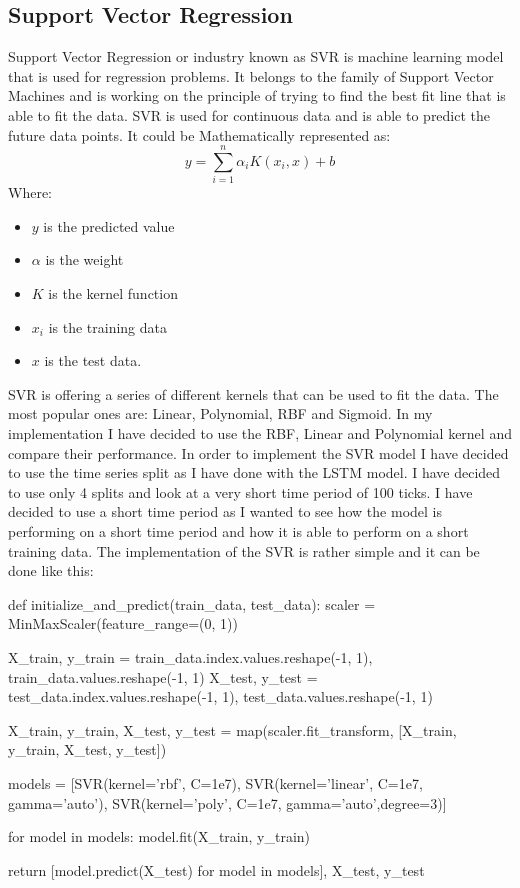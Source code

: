 \documentclass{imc-inf}
\begin{document}
	\subsection{Support Vector Regression}
	Support Vector Regression or industry known as SVR \cite{svr_implement} is machine learning model that is used for regression problems. It belongs to the family of Support Vector Machines and is working on the 
	principle of trying to find the best fit line that is able to fit the data. SVR is used for continuous data and is able to predict the future data points. It could be Mathematically represented as:
	\begin{equation}
		y = \sum_{i=1}^{n} \alpha_i K(x_i,x) + b
	\end{equation}
	Where:
	\begin{itemize}
		\item $y$ is the predicted value
		\item  $\alpha$ is the weight 
		\item  $K$ is the kernel function
		\item  $x_i$ is the training data
		\item  $x$ is the test data.
		
	\end{itemize}
	SVR is offering a series of different kernels that can be used to fit the data. The most popular ones are: Linear, Polynomial, RBF and Sigmoid.
	In my implementation I have decided to use the RBF, Linear and Polynomial kernel and compare their performance. In order to implement the SVR model I have decided to use the time series split as I have done with the LSTM model.
	I have decided to use only 4 splits and look at a very short time period of 100 ticks. I have decided to use a short time period as I wanted to see how the model is performing on a short time period and how it is able to perform 
	on a short training data. The implementation of the SVR is rather simple and it can be done like this:
	
	\begin{code}[language=Python, caption={SVR Models Building}]
		def initialize_and_predict(train_data, test_data):
			scaler = MinMaxScaler(feature_range=(0, 1))
			
			X_train, y_train = train_data.index.values.reshape(-1, 1), train_data.values.reshape(-1, 1)
			X_test, y_test = test_data.index.values.reshape(-1, 1), test_data.values.reshape(-1, 1)
			
			X_train, y_train, X_test, y_test = map(scaler.fit_transform, [X_train, y_train, X_test, y_test])
			
			models = [SVR(kernel='rbf', C=1e7), 
			SVR(kernel='linear', C=1e7, gamma='auto'), 
			SVR(kernel='poly', C=1e7, gamma='auto',degree=3)]
			
			for model in models:
			model.fit(X_train, y_train)
			
			return [model.predict(X_test) for model in models], X_test, y_test
	\end{code}
	
\end{document}

